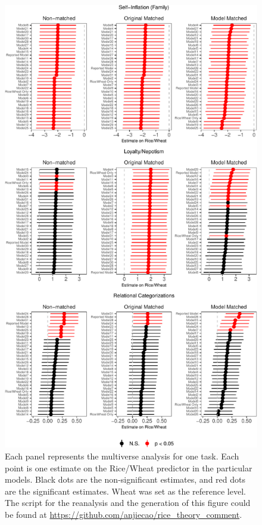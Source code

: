 \documentclass[
  man]{apa6}
\begin{document}
\begin{figure}
\centering
\includegraphics{comment_files/figure-latex/unnamed-chunk-1-1.pdf}
\caption{\label{fig:unnamed-chunk-1} Each panel represents the multiverse analysis for one task. Each point is one estimate on the Rice/Wheat predictor in the particular models. Black dots are the non-significant estimates, and red dots are the significant estimates. Wheat was set as the reference level. The script for the reanalysis and the generation of this figure could be found at \url{https://github.com/anjiecao/rice_theory_comment}.}
\end{figure}
\end{document}
